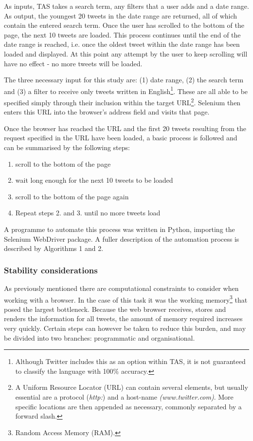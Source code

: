 \documentclass{article}
\begin{document}
As inputs, TAS takes a search term, any filters that a user adds and a date range. As output, the youngest 20 tweets in the date range are returned, all of which contain the entered search term. Once the user has scrolled to the bottom of the page, the next 10 tweets are loaded. This process continues until the end of the date range is reached, i.e. once the oldest tweet within the date range has been loaded and displayed. At this point any attempt by the user to keep scrolling will have no effect - no more tweets will be loaded.

The three necessary input for this study are: (1) date range, (2) the search term and (3) a filter to receive only tweets written in English\footnote{Although Twitter includes this as an option within TAS, it is not guaranteed to classify the language with 100\% accuracy.}. These are all able to be specified simply through their inclusion within the target URL\footnote{A Uniform Resource Locator (URL) can contain several elements, but usually essential are a protocol (\emph{http:}) and a host-name \emph{(www.twitter.com)}. More specific locations are then appended as necessary, commonly separated by a forward slash.}. Selenium then enters this URL into the browser's address field and visits that page.

Once the browser has reached the URL and the first 20 tweets resulting from the request specified in the URL have been loaded, a basic process is followed and can be summarised by the following steps:

\begin{enumerate}
\item scroll to the bottom of the page
\item wait long enough for the next 10 tweets to be loaded
\item scroll to the bottom of the page again
\item Repeat steps 2. and 3. until no more tweets load
\end{enumerate}

A programme to automate this process was written in Python, importing the Selenium WebDriver package. A fuller description of the automation process is described by Algorithms 1 and 2.


\subsubsection{Stability considerations}
\label{sec-3-2-1}

As previously mentioned there are computational constraints to consider when working with a browser. In the case of this task it was the working memory\footnote{Random Access Memory (RAM).} that posed the largest bottleneck. Because the web browser receives, stores and renders the information for all tweets, the amount of memory required increases very quickly. Certain steps can however be taken to reduce this burden, and may be divided into two branches: programmatic and organisational.
\end{document}
